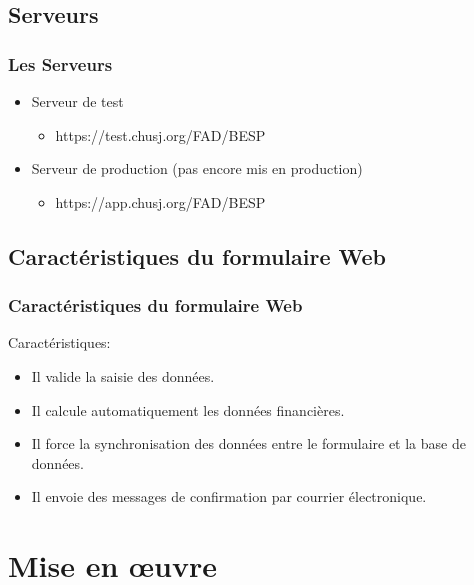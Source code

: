 \documentclass[aspectratio=169]{beamer}%
\begin{document}


\subsection{Serveurs}
\begin{frame}
\transwipe 
\frametitle{Les Serveurs}
\begin{itemize}%

\item Serveur de test 
	\begin{itemize}
	\item https://test.chusj.org/FAD/BESP
	\end{itemize}
\item Serveur de production \color{red}(\small {pas encore mis en production})
	\begin{itemize}
	\item https://app.chusj.org/FAD/BESP
	\end{itemize}
\end{itemize}
\end{frame}

\subsection{Caractéristiques du formulaire Web}
\begin{frame}
\transglitter 
\frametitle{Caractéristiques du formulaire Web}
Caractéristiques:
\begin{itemize}
	\item Il valide la saisie des données.\pause
	\item Il calcule automatiquement les données financières.\pause
	\item Il force la synchronisation des données entre le formulaire et la base de données.\pause
	\item Il envoie des messages de confirmation par courrier électronique.\pause
\end{itemize}
\end{frame}

\section{Mise en œuvre}
\end{document}
